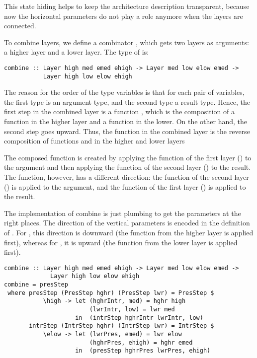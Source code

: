 \bc This state hiding helps to keep the architecture description transparent, because now the horizontal parameters do not play a role anymore when the layers are connected.
\ec


To combine layers, we define a combinator , which gets two layers as arguments: a higher layer and a lower layer. The type of  is:

\begin{small}
\begin{verbatim}
combine :: Layer high med emed ehigh -> Layer med low elow emed -> 
           Layer high low elow ehigh
\end{verbatim}
\end{small}

The reason for the order of the type variables is that for each pair of variables, the first type is an argument type, and the second type  a result type. Hence, the first step in the combined layer is a function , which is the composition of a function  in the higher layer and a function  in the lower. On the other hand, the second step goes upward.  Thus, the function  in the combined layer is the reverse composition of functions  and  in the higher and lower layers
  
\bc The composed  function is created by applying the  function of the first layer () to the  argument and then applying the  function of the second layer () to the result. The  function, however, has a different direction: the  function of the second layer () is applied to the argument, and the  function of the first layer () is applied to the result. \ec

The implementation of combine is just plumbing to get the parameters at the right places. The direction of the vertical parameters is encoded in the definition of . \bc For , this direction is downward (the function from the higher layer is applied first), whereas for , it is upward (the function from the lower layer is applied first). \ec


\begin{small}
\begin{verbatim}
combine :: Layer high med emed ehigh -> Layer med low elow emed -> 
             Layer high low elow ehigh
combine = presStep
 where presStep (PresStep hghr) (PresStep lwr) = PresStep $ 
           \high -> let (hghrIntr, med) = hghr high
                        (lwrIntr, low) = lwr med
                    in  (intrStep hghrIntr lwrIntr, low)
       intrStep (IntrStep hghr) (IntrStep lwr) = IntrStep $
           \elow -> let (lwrPres, emed) = lwr elow
                        (hghrPres, ehigh) = hghr emed
                    in  (presStep hghrPres lwrPres, ehigh)
\end{verbatim}
\end{small}


